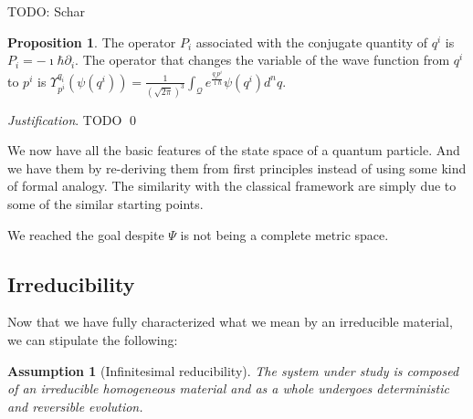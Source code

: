 \documentclass[aps,pra,10pt,twocolumn,floatfix,nofootinbib]{revtex4-1}
\numberwithin{equation}{section}
\newtheorem{assump}{Assumption}
\theoremstyle{definition}
\newtheorem{prop}[equation]{Proposition}
\newenvironment{justification}{\emph{Justification}.}{\qed}
\begin{document}
TODO: Schar

\begin{prop}\label{prop:momentum_operator}
	The operator $P_i$ associated with the conjugate quantity of $q^i$ is $P_i = - \imath \hbar \partial_{i}$. The operator that changes the variable of the wave function from $q^i$ to $p^i$ is $\Upsilon^{q_i}_{p^i} (\psi(q^i)) = \frac{1}{(\sqrt{2\pi})^3} \int_{\mathcal{Q}} e^{\frac{q_i p^i }{\imath \hbar}} \psi(q^i) d^n q $.
\end{prop}
\begin{justification}
	TODO
\end{justification}

We now have all the basic features of the state space of a quantum particle. And we have them by re-deriving them from first principles instead of using some kind of formal analogy. The similarity with the classical framework are simply due to some of the similar starting points.

We reached the goal despite $\Psi$ is not being a complete metric space. 



\subsection{Irreducibility}

Now that we have fully characterized what we mean by an irreducible material, we can stipulate the following:

\begin{assump}[Infinitesimal reducibility]\label{ass:infinitesimal_reducibility}
	The system under study is composed of an irreducible homogeneous material and as a whole undergoes deterministic and reversible evolution.
\end{assump}
\end{document}
